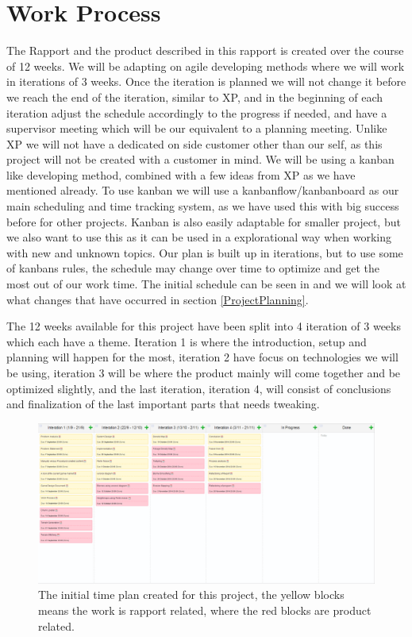 \section{Work Process}
\label{WorkProcess}
The Rapport and the product described in this rapport is created over the course of 12 weeks. We will be adapting on agile developing methods where we will work in iterations of 3 weeks. Once the iteration is planned we will not change it before we reach the end of the iteration, similar to XP, and in the beginning of each iteration adjust the schedule accordingly to the progress if needed, and have a supervisor meeting which will be our equivalent to a planning meeting. Unlike XP we will not have a dedicated on side customer other than our self, as this project will not be created with a customer in mind. We will be using a kanban like developing method, combined with a few ideas from XP as we have mentioned already. To use kanban we will use a kanbanflow/kanbanboard as our main scheduling and time tracking system, as we have used this with big success before for other projects. Kanban is also easily adaptable for smaller project, but we also want to use this as it can be used in a explorational way when working with new and unknown topics. Our plan is built up in iterations, but to use some of kanbans rules, the schedule may change over time to optimize and get the most out of our work time. The initial schedule can be seen in  and we will look at what changes that have occurred in section \ref{ProjectPlanning}.

The 12 weeks available for this project have been split into 4 iteration of 3 weeks which each have a theme. Iteration 1 is where the introduction, setup and planning will happen for the most, iteration 2 have focus on technologies we will be using, iteration 3 will be where the product mainly will come together and be optimized slightly, and the last iteration, iteration 4, will consist of conclusions and finalization of the last important parts that needs tweaking.


\begin{figure}[H]
	\includegraphics[width=1\linewidth]{img/InitTimeplan}
	\centering
	\caption{The initial time plan created for this project, the yellow blocks means the work is rapport related, where the red blocks are product related.}
	\label{fig:InitTimeplan}
\end{figure}
